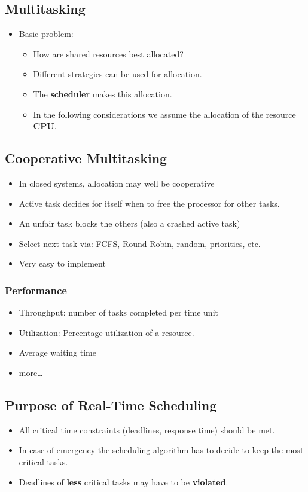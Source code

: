 \subsection{Multitasking}
\begin{itemize}
  \item Basic problem:
        \begin{itemize}
          \item How are shared resources best allocated?
          \item Different strategies can be used for allocation.
          \item The \textbf{scheduler} makes this allocation.
          \item In the following considerations we assume the allocation of the resource \textbf{CPU}.
        \end{itemize}
\end{itemize}

\subsection{Cooperative Multitasking}
\begin{itemize}
  \item In closed systems, allocation may well be cooperative
  \item Active task decides for itself when to free the processor for other tasks.
  \item An unfair task blocks the others (also a crashed active task)
  \item Select next task via: FCFS, Round Robin, random, priorities, etc.
  \item Very easy to implement
\end{itemize}

\subsubsection{Performance}
\begin{itemize}
  \item Throughput: number of tasks completed per time unit
  \item Utilization: Percentage utilization of a resource.
  \item Average waiting time
  \item more\ldots
\end{itemize}

\subsection{Purpose of Real-Time Scheduling}
\begin{itemize}
  \item All critical time constraints (deadlines, response time) should be met.
  \item In case of emergency the scheduling algorithm has to decide to keep the most critical tasks.
  \item Deadlines of \textbf{less} critical tasks may have to be \textbf{violated}.
\end{itemize}


